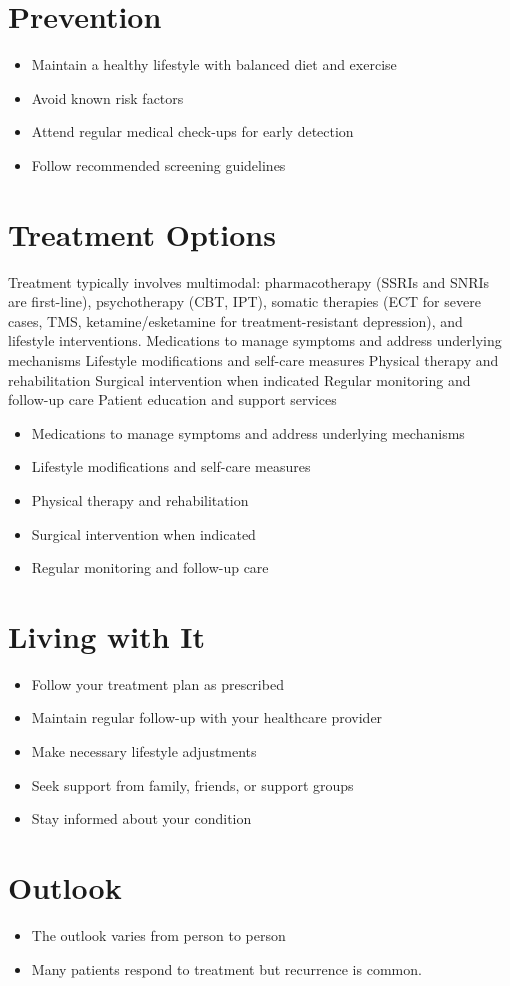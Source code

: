 \section{Prevention}
\begin{itemize}[noitemsep]
  \item Maintain a healthy lifestyle with balanced diet and exercise
  \item Avoid known risk factors
  \item Attend regular medical check-ups for early detection
  \item Follow recommended screening guidelines
\end{itemize}
\section{Treatment Options}
Treatment typically involves multimodal: pharmacotherapy (SSRIs and SNRIs are first-line), psychotherapy (CBT, IPT), somatic therapies (ECT for severe cases, TMS, ketamine/esketamine for treatment-resistant depression), and lifestyle interventions. Medications to manage symptoms and address underlying mechanisms Lifestyle modifications and self-care measures Physical therapy and rehabilitation Surgical intervention when indicated Regular monitoring and follow-up care Patient education and support services

\begin{itemize}[noitemsep]
  \item Medications to manage symptoms and address underlying mechanisms
  \item Lifestyle modifications and self-care measures
  \item Physical therapy and rehabilitation
  \item Surgical intervention when indicated
  \item Regular monitoring and follow-up care
\end{itemize}
\section{Living with It}
\begin{itemize}[noitemsep]
  \item Follow your treatment plan as prescribed
  \item Maintain regular follow-up with your healthcare provider
  \item Make necessary lifestyle adjustments
  \item Seek support from family, friends, or support groups
  \item Stay informed about your condition
\end{itemize}
\section{Outlook}
\begin{itemize}[noitemsep]
  \item The outlook varies from person to person
  \item Many patients respond to treatment but recurrence is common.
\end{itemize}
